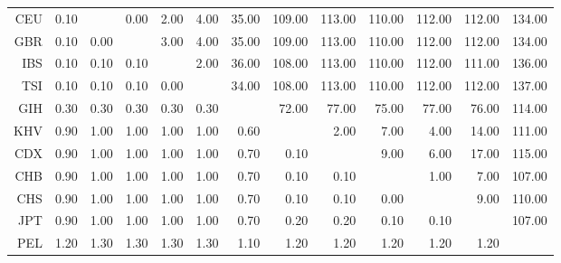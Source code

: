 \begin{longtable}{rrrrrrrrrrrrr}
  CEU & 0.10 &  & 0.00 & 2.00 & 4.00 & 35.00 & 109.00 & 113.00 & 110.00 & 112.00 & 112.00 & 134.00 \\ 
  GBR & 0.10 & 0.00 &  & 3.00 & 4.00 & 35.00 & 109.00 & 113.00 & 110.00 & 112.00 & 112.00 & 134.00 \\ 
  IBS & 0.10 & 0.10 & 0.10 &  & 2.00 & 36.00 & 108.00 & 113.00 & 110.00 & 112.00 & 111.00 & 136.00 \\ 
  TSI & 0.10 & 0.10 & 0.10 & 0.00 &  & 34.00 & 108.00 & 113.00 & 110.00 & 112.00 & 112.00 & 137.00 \\ 
  GIH & 0.30 & 0.30 & 0.30 & 0.30 & 0.30 &  & 72.00 & 77.00 & 75.00 & 77.00 & 76.00 & 114.00 \\ 
  KHV & 0.90 & 1.00 & 1.00 & 1.00 & 1.00 & 0.60 &  & 2.00 & 7.00 & 4.00 & 14.00 & 111.00 \\ 
  CDX & 0.90 & 1.00 & 1.00 & 1.00 & 1.00 & 0.70 & 0.10 &  & 9.00 & 6.00 & 17.00 & 115.00 \\ 
  CHB & 0.90 & 1.00 & 1.00 & 1.00 & 1.00 & 0.70 & 0.10 & 0.10 &  & 1.00 & 7.00 & 107.00 \\ 
  CHS & 0.90 & 1.00 & 1.00 & 1.00 & 1.00 & 0.70 & 0.10 & 0.10 & 0.00 &  & 9.00 & 110.00 \\ 
  JPT & 0.90 & 1.00 & 1.00 & 1.00 & 1.00 & 0.70 & 0.20 & 0.20 & 0.10 & 0.10 &  & 107.00 \\ 
  PEL & 1.20 & 1.30 & 1.30 & 1.30 & 1.30 & 1.10 & 1.20 & 1.20 & 1.20 & 1.20 & 1.20 &  \\ 
   \bottomrule
\end{longtable}
